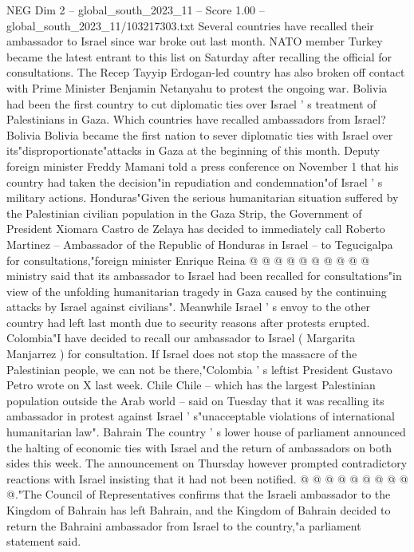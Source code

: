 \begin{textsample}{NEG Dim 2 – global\_south\_2023\_11 – Score 1.00 – global\_south\_2023\_11/103217303.txt}  \label{ex:f2_neg_233}
Several countries have recalled their ambassador to Israel since war broke out last month.
NATO member Turkey became the latest entrant to this list on Saturday after recalling the official for consultations.
The Recep Tayyip Erdogan-led country has also broken off contact with Prime Minister Benjamin Netanyahu to protest the ongoing war.
Bolivia had been the first country to cut diplomatic ties over Israel ' s treatment of Palestinians in Gaza.
Which countries have recalled ambassadors from Israel?
Bolivia Bolivia became the first nation to sever diplomatic ties with Israel over its"disproportionate"attacks in Gaza at the beginning of this month.
Deputy foreign minister Freddy Mamani told a press conference on November 1 that his country had taken the decision"in repudiation and condemnation"of Israel ' s military actions.
Honduras"Given the serious humanitarian situation suffered by the Palestinian civilian population in the Gaza Strip, the Government of President Xiomara Castro de Zelaya has decided to immediately call Roberto Martinez -- Ambassador of the Republic of Honduras in Israel -- to Tegucigalpa for consultations,"foreign minister Enrique Reina @ @ @ @ @ @ @ @ @ @ ministry said that its ambassador to Israel had been recalled for consultations"in view of the unfolding humanitarian tragedy in Gaza caused by the continuing attacks by Israel against civilians".
Meanwhile Israel ' s envoy to the other country had left last month due to security reasons after protests erupted.
Colombia"I have decided to recall our ambassador to Israel ( Margarita Manjarrez ) for consultation.
If Israel does not stop the massacre of the Palestinian people, we can not be there,"Colombia ' s leftist President Gustavo Petro wrote on X last week.
Chile Chile -- which has the largest Palestinian population outside the Arab world -- said on Tuesday that it was recalling its ambassador in protest against Israel ' s"unacceptable violations of international humanitarian law".
Bahrain The country ' s lower house of parliament announced the halting of economic ties with Israel and the return of ambassadors on both sides this week.
The announcement on Thursday however prompted contradictory reactions with Israel insisting that it had not been notified. @ @ @ @ @ @ @ @ @ @."The Council of Representatives confirms that the Israeli ambassador to the Kingdom of Bahrain has left Bahrain, and the Kingdom of Bahrain decided to return the Bahraini ambassador from Israel to the country,"a parliament statement said.

\end{textsample}
